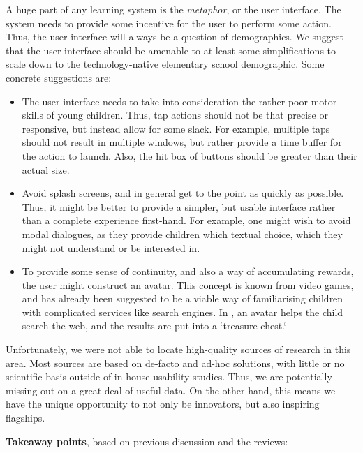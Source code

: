 A huge part of any learning system is the \textit{metaphor}, or the user
interface. The system needs to provide some incentive for the user to perform
some action. Thus, the user interface will always be a question of demographics.
We suggest that the user interface should be amenable to at least some
simplifications to scale down to the technology-native elementary school
demographic. Some concrete suggestions are:

\begin{itemize}
\item The user interface needs to take into consideration the rather poor motor
skills of young children.\cite{kidsquora} Thus, tap actions should not be that
precise or responsive, but instead allow for some slack. For example, multiple
taps should not result in multiple windows, but rather provide a time buffer for
the action to launch. Also, the hit box of buttons should be greater than their
actual size.
\item Avoid splash screens,\cite{kidsluke} and in general get to the point as quickly as
possible. Thus, it might be better to provide a simpler, but usable interface
rather than a complete experience first-hand. For example, one might wish to
avoid modal dialogues, as they provide children which textual choice, which they
might not understand or be interested in.
\item To provide some sense of continuity, and also a way of accumulating
rewards, the user might construct an avatar. This concept is known from video
games, and has already been suggested to be a viable way of familiarising
children with complicated services like search engines.
In \cite{gossen2012search}, an avatar helps the child search the web, and the
results are put into a `treasure chest.`
\end{itemize}

Unfortunately, we were not able to locate high-quality sources of research in
this area. Most sources are based on de-facto and ad-hoc solutions, with little
or no scientific basis outside of in-house usability studies. Thus, we are
potentially missing out on a great deal of useful data. On the other hand, 
this means we have the unique opportunity to not only be innovators, but also 
inspiring flagships.

\textbf{Takeaway points}, based on previous discussion and the reviews:

